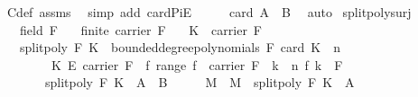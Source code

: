 \begin{isabellebody}
\ C{\isacharunderscore}{\kern0pt}def\ assms{\isacharparenleft}{\kern0pt}{}{\isacharparenright}{\kern0pt}\ \isamarkupfalse%
\ {\isacharparenleft}{\kern0pt}simp\ add{\isacharcolon}{\kern0pt}\ card{\isacharunderscore}{\kern0pt}PiE{\isacharparenright}{\kern0pt}\isanewline
\ \ \isamarkupfalse%
\ \isamarkupfalse%
\ {\isachardoublequoteopen}card\ {\isacharquery}{\kern0pt}A\ {\isacharequal}{\kern0pt}\ {\isacharquery}{\kern0pt}B{\isachardoublequoteclose}\ \isamarkupfalse%
\ auto\isanewline
{}\isamarkupfalse%
%
\endisatagproof
{\isafoldproof}%
%
\isadelimproof
\isanewline
%
\endisadelimproof
\isanewline
{}\isamarkupfalse%
\ split{\isacharunderscore}{\kern0pt}poly{\isacharunderscore}{\kern0pt}surj{\isacharcolon}{\kern0pt}\isanewline
\ \ \ {\isachardoublequoteopen}field\ F{\isachardoublequoteclose}\isanewline
\ \ \ {\isachardoublequoteopen}finite\ {\isacharparenleft}{\kern0pt}carrier\ F{\isacharparenright}{\kern0pt}{\isachardoublequoteclose}\isanewline
\ \ \ {\isachardoublequoteopen}K\ {\isasymsubseteq}\ carrier\ F{\isachardoublequoteclose}\isanewline
\ \ \ {\isachardoublequoteopen}split{\isacharunderscore}{\kern0pt}poly\ F\ K\ {\isacharbackquote}{\kern0pt}\ bounded{\isacharunderscore}{\kern0pt}degree{\isacharunderscore}{\kern0pt}polynomials\ F\ {\isacharparenleft}{\kern0pt}card\ K\ {\isacharplus}{\kern0pt}\ n{\isacharparenright}{\kern0pt}\ {\isacharequal}{\kern0pt}\isanewline
\ \ \ \ \ \ \ \ {\isacharparenleft}{\kern0pt}K\ {\isasymrightarrow}\isactrlsub E\ carrier\ F{\isacharparenright}{\kern0pt}\ {\isasymtimes}\ {\isacharbraceleft}{\kern0pt}f{\isachardot}{\kern0pt}\ range\ f\ {\isasymsubseteq}\ carrier\ F\ {\isasymand}\ {\isacharparenleft}{\kern0pt}{\isasymforall}k\ {\isasymge}\ n{\isachardot}{\kern0pt}\ f\ k\ {\isacharequal}{\kern0pt}\ {\isasymzero}\isactrlbsub F\isactrlesub {\isacharparenright}{\kern0pt}{\isacharbraceright}{\kern0pt}{\isachardoublequoteclose}\ \isanewline
\ \ \ \ \ \ {\isacharparenleft}{\kern0pt}\ {\isachardoublequoteopen}split{\isacharunderscore}{\kern0pt}poly\ F\ K\ {\isacharbackquote}{\kern0pt}\ {\isacharquery}{\kern0pt}A\ {\isacharequal}{\kern0pt}\ {\isacharquery}{\kern0pt}B{\isachardoublequoteclose}{\isacharparenright}{\kern0pt}\isanewline
%
\isadelimproof
%
\endisadelimproof
%
\isatagproof
{}\isamarkupfalse%
\ {\isacharminus}{\kern0pt}\isanewline
\ \ \isamarkupfalse%
\ M\ \ {\isachardoublequoteopen}M\ {\isacharequal}{\kern0pt}\ split{\isacharunderscore}{\kern0pt}poly\ F\ K\ {\isacharbackquote}{\kern0pt}\ {\isacharquery}{\kern0pt}A{\isachardoublequoteclose}\isanewline

\end{isabellebody}
